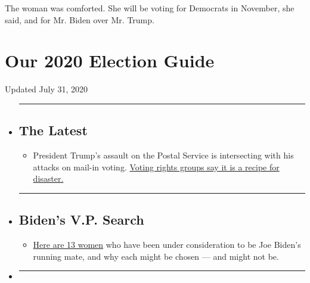 The woman was comforted. She will be voting for Democrats in November,
she said, and for Mr. Biden over Mr. Trump.

\hypertarget{our-2020-election-guide}{%
\section{Our 2020 Election Guide}\label{our-2020-election-guide}}

Updated July 31, 2020

\begin{itemize}
\item
  \begin{center}\rule{0.5\linewidth}{\linethickness}\end{center}

  \hypertarget{the-latest}{%
  \subsection{The Latest}\label{the-latest}}

  \begin{itemize}
  \tightlist
  \item
    President Trump's assault on the Postal Service is intersecting with
    his attacks on mail-in voting.
    \href{https://www.nytimes.com/2020/07/31/us/politics/trump-usps-mail-delays.html?action=click\&pgtype=Article\&state=default\&region=BELOW_MAIN_CONTENT\&context=storylines_guide}{Voting
    rights groups say it is a recipe for disaster.}
  \end{itemize}
\item
  \begin{center}\rule{0.5\linewidth}{\linethickness}\end{center}

  \hypertarget{bidens-vp-search}{%
  \subsection{Biden's V.P. Search}\label{bidens-vp-search}}

  \begin{itemize}
  \tightlist
  \item
    \href{https://www.nytimes.com/article/biden-vice-president-2020.html?action=click\&pgtype=Article\&state=default\&region=BELOW_MAIN_CONTENT\&context=storylines_guide}{Here
    are 13 women} who have been under consideration to be Joe Biden's
    running mate, and why each might be chosen --- and might not be.
  \end{itemize}
\item
  \begin{center}\rule{0.5\linewidth}{\linethickness}\end{center}


\end{itemize}
